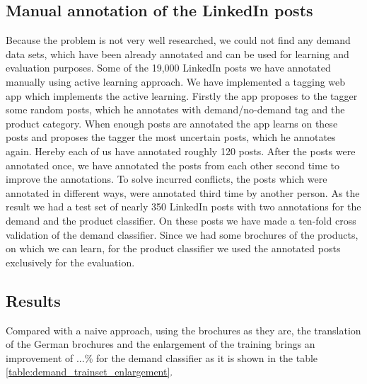 
\subsection{Manual annotation of the LinkedIn posts} %
\label{sub:manual_annotation_of_the_linkedin_posts}
Because the \nto problem is not very well researched, we could not find any demand data sets, which have been already annotated and can be used for learning and evaluation purposes.
Some of the 19,000 LinkedIn posts we have annotated manually using active learning approach.
We have implemented a tagging web app which implements the active learning.
Firstly the app proposes to the tagger some random posts, which he annotates with demand/no-demand tag and the product category.
When enough posts are annotated the app learns on these posts and proposes the tagger the most uncertain posts, which he annotates again.
Hereby each of us have annotated roughly 120 posts.
After the posts were annotated once, we have annotated the posts from each other second time to improve the annotations.
To solve incurred conflicts, the posts which were annotated in different ways, were annotated third time by another person.
As the result we had a test set of nearly 350 LinkedIn posts with two annotations for the demand and the product classifier.
On these posts we have made a ten-fold cross validation of the demand classifier.
Since we had some brochures of the products, on which we can learn, for the product classifier we used the annotated posts exclusively for the evaluation.


\subsection{Results} %
\label{sub:results}
Compared with a naive approach, using the brochures as they are, the translation of the German brochures and the enlargement of the training brings an improvement of ...\% for the demand classifier as it is shown in the table \ref{table:demand_trainset_enlargement}.







\endinput
\begin{itemize}
	\item Introduce our data set (show numbers, show examples)
	\item How we got our training data (everything at least twice, use the demands for learning, use the products for evaluation, Active Learning approach)
	\item Reference Precision/Recall from above again, final
	\item Evaluate of the training data generation, which approach is best (random, grouping)
\end{itemize}


